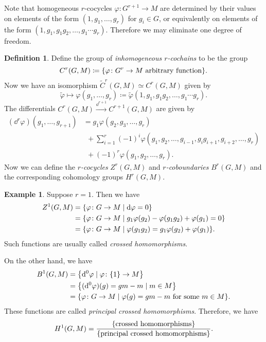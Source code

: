 \documentclass[leqno, openany]{memoir}
\theoremstyle{definition}
\newtheorem{defn}[thm]{Definition}
\newtheorem{exm}[thm]{Example}
\theoremstyle{remark}
\theoremstyle{plain}
\theoremstyle{definition}
\theoremstyle{remark}
\newcommand{\wt}[1]{\widetilde{#1}}
\begin{document}
Note that homogeneous $r$-cocycles $\varphi \colon G^{r+1} \to M$ are
determined by their values on elements of the form $(1, g_1, \ldots, g_r)$ for
$g_i \in G$, or equivalently on elements of the form $(1, g_1, g_1g_2, \ldots,
g_1 \cdots g_r)$. Therefore we may eliminate one degree of freedom. 

\begin{defn} Define the group of \textit{inhomogeneous $r$-cochains} to be the
    group \[ C^r(G, M) \coloneqq \qty{\varphi \colon G^r \to M\ \text{arbitrary
    function}}. \] Now we have an isomorphism $\wt{C}^r(G, M) \simeq C^r(G, M)$
    given by \[ \wt{\varphi} \mapsto \varphi(g_1, \ldots, g_r) \coloneqq
        \wt{\varphi}(1, g_1, g_1g_2, \ldots, g_1 \cdots g_r). \] The
        differentials $C^r(G, M) \xrightarrow{\dd^{r+1}} C^{r+1}(G, M)$ are
        given by \begin{align*} (\dd^r \varphi)(g_1, \ldots, g_{r+1}) &= g_1
            \varphi(g_2, g_3, \ldots, g_r) \\ &\ \ + \sum_{i=1}^r {(-1)}^i
        \varphi(g_1, g_2, \ldots, g_{i-1}, g_i g_{i+1}, g_{i+2}, \ldots, g_r)
                                           \\ &\ \ + {(-1)}^r \varphi(g_1, g_2,
                                       \ldots, g_r).  \end{align*} Now we can
                                       define the \textit{$r$-cocycles} $Z^r(G,
                                       M)$ and \textit{$r$-coboundaries}
                                       $B^r(G, M)$ and the corresponding
                                       cohomology groups $H^r(G, M)$.
        \end{defn}

\begin{exm} Suppose $r = 1$. Then we have \begin{align*} Z^1(G, M) &=
    \qty{\varphi \colon G \to M \mid \dd \varphi = 0} \\ &= \qty{\varphi \colon
    G \to M \mid g_1 \varphi(g_2) - \varphi(g_1g_2) + \varphi(g_1) = 0} \\ &=
    \qty{\varphi \colon G \to M \mid \varphi(g_1g_2) = g_1 \varphi(g_2) +
    \varphi(g_1)}.  \end{align*} Such functions are usually called
    \textit{crossed homomorphisms}. 

    On the other hand, we have \begin{align*} B^1(G, M) &= \qty{\dd^0 \varphi
        \mid \varphi \colon \qty{1} \to M} \\ &= \qty{(\dd^0\varphi)(g) = gm -
    m \mid m \in M} \\ &= \qty{\varphi \colon G \to M \mid \varphi(g) = gm - m\
\text{for some $m \in M$}}.  \end{align*} These functions are called
\textit{principal crossed homomorphisms}. Therefore, we have \[ H^1(G, M) =
\frac{\qty{\text{crossed homomorphisms}}}{\qty{\text{principal crossed
homomorphisms}}}. \] \end{exm}
\end{document}
